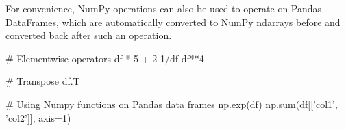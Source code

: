 
For convenience, NumPy operations can also be used to operate on Pandas DataFrames, which are automatically converted to NumPy ndarrays before and converted back after such an operation. 

\begin{pythoncode}
# Elementwise operators
df * 5 + 2
1/df
df**4

# Transpose
df.T

# Using Numpy functions on Pandas data frames
np.exp(df)
np.sum(df[['col1', 'col2']], axis=1)
\end{pythoncode}







